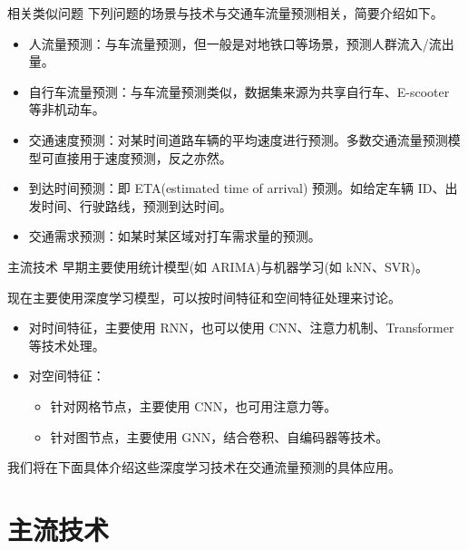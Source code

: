 \documentclass{libs/format}
\begin{document}
\begin{frame}{相关类似问题}
  下列问题的场景与技术与交通车流量预测相关，简要介绍如下。
  \begin{itemize}
    \item 人流量预测：与车流量预测，但一般是对地铁口等场景，预测人群流入/流出量。\cite{T-ZS44}
    \item 自行车流量预测：与车流量预测类似，数据集来源为共享自行车\cite{T-162}、E-scooter\cite{T-286} 等非机动车。
    \item 交通速度预测：对某时间道路车辆的平均速度进行预测。多数交通流量预测模型可直接用于速度预测，反之亦然。
    \item 到达时间预测：即 ETA(estimated time of arrival) 预测。如给定车辆 ID、出发时间、行驶路线，预测到达时间。\cite{T-316}
    \item 交通需求预测：如某时某区域对打车需求量的预测。
  \end{itemize}
\end{frame}

\begin{frame}{主流技术}
  早期主要使用统计模型(如 ARIMA)与机器学习(如 kNN、SVR)。\cite{T-ZS1}

  现在主要使用深度学习模型，可以按时间特征和空间特征处理来讨论。
  \begin{itemize}
    \item 对时间特征，主要使用 RNN，也可以使用 CNN、注意力机制、Transformer 等技术处理。
    \item 对空间特征：
    \begin{itemize}
      \item 针对网格节点，主要使用 CNN，也可用注意力等。
      \item 针对图节点，主要使用 GNN，结合卷积、自编码器等技术。
    \end{itemize}
  \end{itemize}

  我们将在下面具体介绍这些深度学习技术在交通流量预测的具体应用。
\end{frame}

\section{主流技术}
\end{document}
